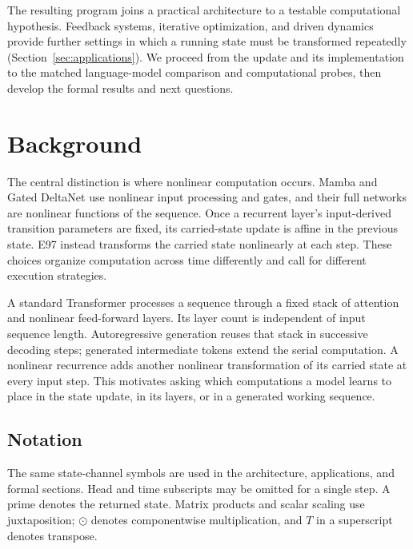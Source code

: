 \documentclass[10pt]{article}
\theoremstyle{canonical}
\theoremstyle{canonicalbullet}
\begin{document}
The resulting program joins a practical architecture to a testable computational hypothesis. Feedback systems, iterative optimization, and driven dynamics provide further settings in which a running state must be transformed repeatedly (Section~\ref{sec:applications}). We proceed from the update and its implementation to the matched language-model comparison and computational probes, then develop the formal results and next questions.


\section{Background}\label{sec:background}


The central distinction is where nonlinear computation occurs. Mamba \citep{mamba2024} and Gated DeltaNet \citep{gated_deltanet2024} use nonlinear input processing and gates, and their full networks are nonlinear functions of the sequence. Once a recurrent layer's input-derived transition parameters are fixed, its carried-state update is affine in the previous state. E97 instead transforms the carried state nonlinearly at each step. These choices organize computation across time differently and call for different execution strategies.

A standard Transformer \citep{vaswani2017attention} processes a sequence through a fixed stack of attention and nonlinear feed-forward layers. Its layer count is independent of input sequence length. Autoregressive generation reuses that stack in successive decoding steps; generated intermediate tokens extend the serial computation. A nonlinear recurrence adds another nonlinear transformation of its carried state at every input step. This motivates asking which computations a model learns to place in the state update, in its layers, or in a generated working sequence.


\subsection*{Notation}


The same state-channel symbols are used in the architecture, applications, and formal sections. Head and time subscripts may be omitted for a single step. A prime denotes the returned state. Matrix products and scalar scaling use juxtaposition; $\odot $ denotes componentwise multiplication, and $T $ in a superscript denotes transpose.
\end{document}
